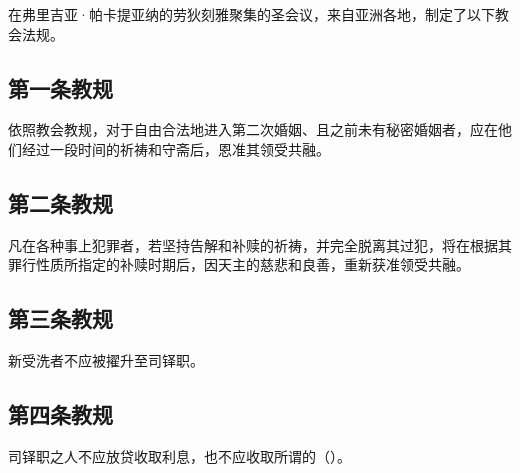 \par

在弗里吉亚·帕卡提亚纳的劳狄刻雅聚集的圣会议，来自亚洲各地，制定了以下教会法规。\par


\subsection{第一条教规}

依照教会教规，对于自由合法地进入第二次婚姻、且之前未有秘密婚姻者，应在他们经过一段时间的祈祷和守斋后，恩准其领受共融。\par


\subsection{第二条教规}

凡在各种事上犯罪者，若坚持告解和补赎的祈祷，并完全脱离其过犯，将在根据其罪行性质所指定的补赎时期后，因天主的慈悲和良善，重新获准领受共融。\par


\subsection{第三条教规}

新受洗者不应被擢升至司铎职。\par


\subsection{第四条教规}

司铎职之人不应放贷收取利息，也不应收取所谓的（）。\par

\par

